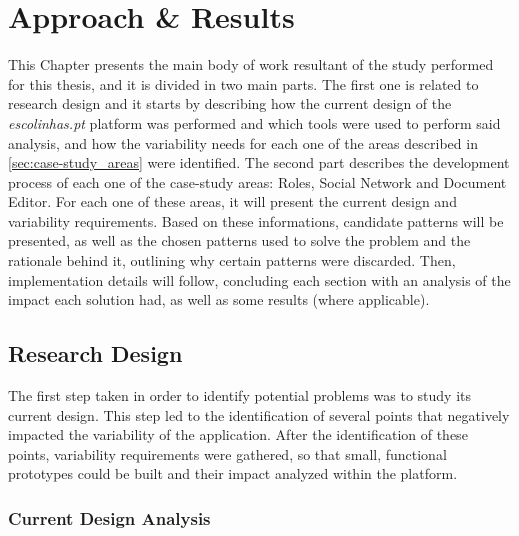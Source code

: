 \chapter{Approach \& Results}\label{chap:approach_results}

This Chapter presents the main body of work resultant of the study performed for this thesis, and it is divided in two main parts. The first one is related to research design and it starts by describing how the current design of the \emph{escolinhas.pt} platform was performed and which tools were used to perform said analysis, and how the variability needs for each one of the areas described in \ref{sec:case-study_areas} were identified. The second part describes the development process of each one of the case-study areas: Roles, Social Network and Document Editor. For each one of these areas, it will present the current design and variability requirements. Based on these informations, candidate patterns will be presented, as well as the chosen patterns used to solve the problem and the rationale behind it, outlining why certain patterns were discarded. Then, implementation details will follow, concluding each section with an analysis of the impact each solution had, as well as some results (where applicable).

\section{Research Design}\label{sec:research_design}

The first step taken in order to identify potential problems was to study its current design. This step led to the identification of several points that negatively impacted the variability of the application. After the identification of these points, variability requirements were gathered, so that small, functional prototypes could be built and their impact analyzed within the platform.

\subsection{Current Design Analysis}\label{sec:current_design_analysis}

